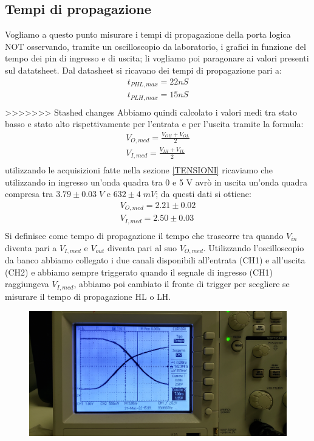 \documentclass[10pt, a4paper, italian]{article}
\begin{document}
\subsection{Tempi di propagazione}
Vogliamo a questo punto misurare i tempi di propagazione della porta logica NOT osservando, tramite un oscilloscopio da laboratorio, i grafici in funzione del tempo dei pin di ingresso e di uscita; li vogliamo poi paragonare ai valori presenti sul datatsheet.
Dal datasheet si ricavano dei tempi di propagazione pari a:
\begin{gather*}
    t_{PHL,max}=22 nS\\
    t_{PLH,max}=15 nS\\
\end{gather*}
>>>>>>> Stashed changes
Abbiamo quindi calcolato i valori medi tra stato basso e stato alto rispettivamente per l'entrata e per l'uscita tramite la formula:
\begin{gather*}
V_{O,med}=\frac{V_{OH}+V_{OL}}{2}\\
V_{I,med}=\frac{V_{IH}+V_{IL}}{2}\\
\end{gather*}
utilizzando le acquisizioni fatte nella sezione \ref{TENSIONI} ricaviamo che utilizzando in ingresso un'onda quadra tra 0 e 5 V avrò in uscita un'onda quadra compresa tra $3.79 \pm 0.03 \; V$ e $ 632 \pm 4 \; mV$; da questi dati si ottiene:
\begin{gather*}
V_{O,med}=2.21 \pm 0.02\\
V_{I,med}=2.50 \pm 0.03\\
\end{gather*}
Si definisce come tempo di propagazione il tempo che trascorre tra quando $V_{in}$ diventa pari a $V_{I,med}$ e $V_{out}$ diventa pari al suo $V_{O,med}$.
Utilizzando l'oscilloscopio da banco abbiamo collegato i due canali disponibili all'entrata (CH1) e all'uscita (CH2) e abbiamo sempre triggerato quando il segnale di ingresso (CH1) raggiungeva $V_{I,med}$, abbiamo poi cambiato il fronte di trigger per scegliere se misurare il tempo di propagazione HL o LH.
\begin{figure}
	\includegraphics[width=\textwidth]{LH1}
\end{figure}
\end{document}
